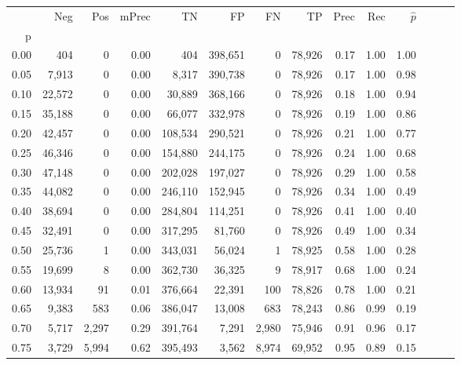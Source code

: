 \begin{tabular}{rrrrrrrrrrrrrr}
\toprule
{} &     Neg &     Pos & mPrec &       TN &       FP &      FN &      TP &  Prec &   Rec & $\hat{p}$ \\
p    &         &         &       &          &          &         &         &       &       &           \\
\midrule
0.00 &     404 &       0 &  0.00 &      404 &  398,651 &       0 &  78,926 &  0.17 &  1.00 &      1.00 \\
0.05 &   7,913 &       0 &  0.00 &    8,317 &  390,738 &       0 &  78,926 &  0.17 &  1.00 &      0.98 \\
0.10 &  22,572 &       0 &  0.00 &   30,889 &  368,166 &       0 &  78,926 &  0.18 &  1.00 &      0.94 \\
0.15 &  35,188 &       0 &  0.00 &   66,077 &  332,978 &       0 &  78,926 &  0.19 &  1.00 &      0.86 \\
0.20 &  42,457 &       0 &  0.00 &  108,534 &  290,521 &       0 &  78,926 &  0.21 &  1.00 &      0.77 \\
0.25 &  46,346 &       0 &  0.00 &  154,880 &  244,175 &       0 &  78,926 &  0.24 &  1.00 &      0.68 \\
0.30 &  47,148 &       0 &  0.00 &  202,028 &  197,027 &       0 &  78,926 &  0.29 &  1.00 &      0.58 \\
0.35 &  44,082 &       0 &  0.00 &  246,110 &  152,945 &       0 &  78,926 &  0.34 &  1.00 &      0.49 \\
0.40 &  38,694 &       0 &  0.00 &  284,804 &  114,251 &       0 &  78,926 &  0.41 &  1.00 &      0.40 \\
0.45 &  32,491 &       0 &  0.00 &  317,295 &   81,760 &       0 &  78,926 &  0.49 &  1.00 &      0.34 \\
0.50 &  25,736 &       1 &  0.00 &  343,031 &   56,024 &       1 &  78,925 &  0.58 &  1.00 &      0.28 \\
0.55 &  19,699 &       8 &  0.00 &  362,730 &   36,325 &       9 &  78,917 &  0.68 &  1.00 &      0.24 \\
0.60 &  13,934 &      91 &  0.01 &  376,664 &   22,391 &     100 &  78,826 &  0.78 &  1.00 &      0.21 \\
0.65 &   9,383 &     583 &  0.06 &  386,047 &   13,008 &     683 &  78,243 &  0.86 &  0.99 &      0.19 \\
0.70 &   5,717 &   2,297 &  0.29 &  391,764 &    7,291 &   2,980 &  75,946 &  0.91 &  0.96 &      0.17 \\
0.75 &   3,729 &   5,994 &  0.62 &  395,493 &    3,562 &   8,974 &  69,952 &  0.95 &  0.89 &      0.15 \\

\end{tabular}
